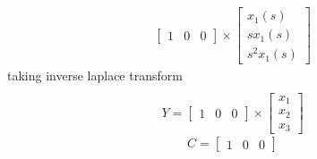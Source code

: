 \begin{enumerate}[label=\thesection.\arabic*.,ref=\thesection.\theenumi]
\begin{gather}
\begin{bmatrix}
1&0&0
\end{bmatrix}\times \begin{bmatrix}
x_{1}(s)\\
sx_{1}(s)\\
s^2x_{1}(s)
\end{bmatrix} 
\end{gather}
taking inverse laplace transform
\begin{gather}
\\Y=
\begin{bmatrix}
1&0&0
\end{bmatrix}\times \begin{bmatrix}
x_{1}\\
x_{2}\\
x_{3}
\end{bmatrix} 
\end{gather}
\begin{equation}
C=\begin{bmatrix}
1&0&0
\end{bmatrix}
\end{equation}
%

%
\end{enumerate}

